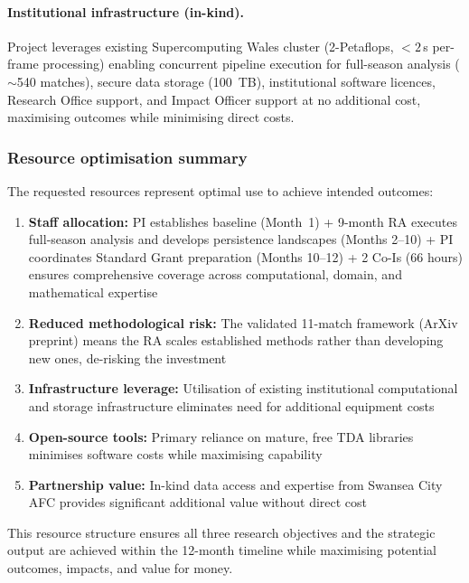 \paragraph{Institutional infrastructure (in-kind).}
Project leverages existing Supercomputing Wales cluster (2-Petaflops, ${<}2$\,s per-frame processing) enabling concurrent pipeline execution for full-season analysis ($\sim$540 matches), secure data storage (100~TB), institutional software licences, Research Office support, and Impact Officer support at no additional cost, maximising outcomes while minimising direct costs.

\subsubsection{Resource optimisation summary}

The requested resources represent optimal use to achieve intended outcomes:
\begin{enumerate}[label=\arabic*., itemsep=0.25em]
  \item \textbf{Staff allocation:} PI establishes baseline (Month~1) + 9-month RA executes full-season analysis and develops persistence landscapes (Months 2--10) + PI coordinates Standard Grant preparation (Months 10--12) + 2 Co-Is (66 hours) ensures comprehensive coverage across computational, domain, and mathematical expertise
  \item \textbf{Reduced methodological risk:} The validated 11-match framework (ArXiv preprint) means the RA scales established methods rather than developing new ones, de-risking the investment
  \item \textbf{Infrastructure leverage:} Utilisation of existing institutional computational and storage infrastructure eliminates need for additional equipment costs
  \item \textbf{Open-source tools:} Primary reliance on mature, free TDA libraries minimises software costs while maximising capability
  \item \textbf{Partnership value:} In-kind data access and expertise from Swansea City AFC provides significant additional value without direct cost
\end{enumerate}

This resource structure ensures all three research objectives and the strategic output are achieved within the 12-month timeline while maximising potential outcomes, impacts, and value for money.
